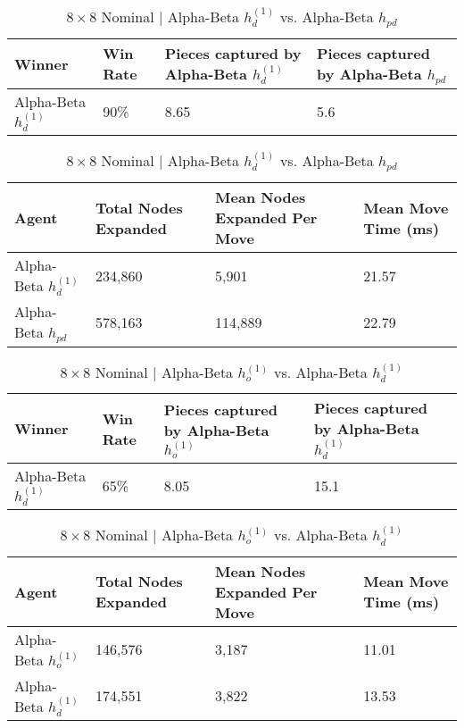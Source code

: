 \documentclass{article}[12pt]
\begin{document}
%

\begin{table}[ht]
	\centering
	\begin{tabular}{l | l | l | l}
		\hline
		Winner & Win Rate & Pieces captured by Alpha-Beta $h_{d}^{(1)}$ & Pieces captured by Alpha-Beta $h_{pd}$ \\
		\hline \hline 
		Alpha-Beta $h_{d}^{(1)}$ & 90\% & 8.65 & 5.6 \\
		\hline
	\end{tabular}
	
	\vspace{10px}
	
	\begin{tabular}{l | l | l | l}
		\hline
		Agent & Total Nodes Expanded & Mean Nodes Expanded Per Move & Mean Move Time (ms) \\
		\hline \hline 
		Alpha-Beta $h_{d}^{(1)}$  & 234,860 & 5,901 & 21.57 \\
		Alpha-Beta $h_{pd}$ & 578,163 & 114,889 & 22.79\\
		\hline
	\end{tabular}
	\caption{$8 \times 8$ Nominal | Alpha-Beta $h_{d}^{(1)}$ vs. Alpha-Beta $h_{pd}$} \label{tab:t15}
\end{table}

% 

\begin{table}[ht]
	\centering
	\begin{tabular}{l | l | l | l}
		\hline
		Winner & Win Rate & Pieces captured by Alpha-Beta $h_{o}^{(1)}$ & Pieces captured by Alpha-Beta $h_{d}^{(1)}$ \\
		\hline \hline 
		Alpha-Beta $h_{d}^{(1)}$ & 65\% & 8.05 & 15.1 \\
		\hline
	\end{tabular}
	
	\vspace{10px}
	
	\begin{tabular}{l | l | l | l}
		\hline
		Agent & Total Nodes Expanded & Mean Nodes Expanded Per Move & Mean Move Time (ms) \\
		\hline \hline 
		Alpha-Beta $h_{o}^{(1)}$  & 146,576 & 3,187 & 11.01 \\
		Alpha-Beta $h_{d}^{(1)}$ & 174,551 & 3,822 & 13.53\\
		\hline
	\end{tabular}
	\caption{$8 \times 8$ Nominal | Alpha-Beta $h_{o}^{(1)}$ vs. Alpha-Beta $h_{d}^{(1)}$} \label{tab:t16}
\end{table}
\end{document}
